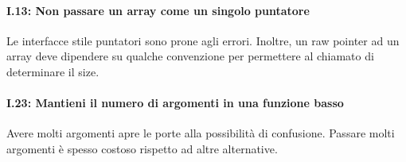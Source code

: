 \paragraph{I.13: Non passare un array come un singolo puntatore}

\textsf{\small Le interfacce stile puntatori sono prone agli errori. Inoltre, un raw pointer ad un array deve dipendere su qualche convenzione per permettere al chiamato di determinare il size. } \\

\paragraph{I.23: Mantieni il numero di argomenti in una funzione basso}

\textsf{\small Avere molti argomenti apre le porte alla possibilità di confusione. Passare molti argomenti è spesso costoso rispetto ad altre alternative.} \\

